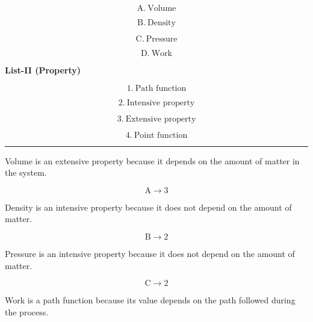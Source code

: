 \documentclass[12pt]{article}
\newcommand{\myanswer}[2]{
    \noindent{\headingfont\Large #1\space #2\par}
    \vspace{4pt}
    \hrule
    \vspace{15pt}
}
\begin{document}
\begin{equation*}
\mathrm{A.}\ \text{Volume}
\end{equation*}

\begin{equation*}
\mathrm{B.}\ \text{Density}
\end{equation*}

\begin{equation*}
\mathrm{C.}\ \text{Pressure}
\end{equation*}

\begin{equation*}
\mathrm{D.}\ \text{Work}
\end{equation*}

\textbf{List-II (Property)}

\begin{equation*}
1.\ \text{Path function}
\end{equation*}

\begin{equation*}
2.\ \text{Intensive property}
\end{equation*}

\begin{equation*}
3.\ \text{Extensive property}
\end{equation*}

\begin{equation*}
4.\ \text{Point function}
\end{equation*}

\myanswer{}{Answer :}

Volume is an extensive property because it depends on the amount of matter in the system.

\begin{equation*}
\mathrm{A}\longrightarrow3
\end{equation*}

Density is an intensive property because it does not depend on the amount of matter.

\begin{equation*}
\mathrm{B}\longrightarrow2
\end{equation*}

Pressure is an intensive property because it does not depend on the amount of matter.

\begin{equation*}
\mathrm{C}\longrightarrow2
\end{equation*}

Work is a path function because its value depends on the path followed during the process.
\end{document}

